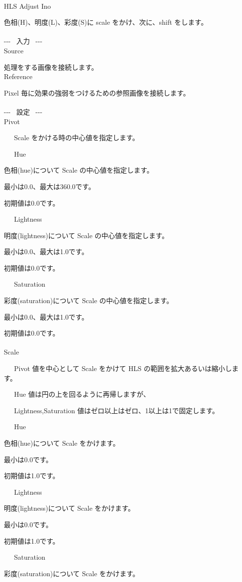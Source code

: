 \documentclass[a4paper,12pt]{article}
\begin{document}
\thispagestyle{empty}

\Large
\noindent \\
HLS Adjust Ino\medskip
\par
\normalsize
色相(H)、明度(L)、彩度(S)に scale をかけ、次に、shift をします。\\
\\
-{-}- \ 入力 \ -{-}-\\
Source\par
処理をする画像を接続します。\\
Reference\par
Pixel 毎に効果の強弱をつけるための参照画像を接続します。\\
\\
-{-}- \ 設定 \ -{-}-\\
Pivot\par
\noindent \ \ \, Scale をかける時の中心値を指定します。\\
\par
\noindent \ \ \, Hue\par
色相(hue)について Scale の中心値を指定します。\par
最小は0.0、最大は360.0です。\par
初期値は0.0です。\par
\noindent \ \ \, Lightness\par
明度(lightness)について Scale の中心値を指定します。\par
最小は0.0、最大は1.0です。\par
初期値は0.0です。\par
\noindent \ \ \, Saturation\par
彩度(saturation)について Scale の中心値を指定します。\par
最小は0.0、最大は1.0です。\par
初期値は0.0です。\\
\\
Scale\par
\noindent \ \ \, Pivot 値を中心として Scale をかけて HLS の範囲を拡大あるいは縮小します。\par
\noindent \ \ \, Hue 値は円の上を回るように再帰しますが、\par
\noindent \ \ \, Lightness,Saturation 値はゼロ以上はゼロ、1以上は1で固定します。\\
\par
\noindent \ \ \, Hue\par
色相(hue)について Scale をかけます。\par
最小は0.0です。\par
初期値は1.0です。\par
\noindent \ \ \, Lightness\par
明度(lightness)について Scale をかけます。\par
最小は0.0です。\par
初期値は1.0です。\par
\noindent \ \ \, Saturation\par
彩度(saturation)について Scale をかけます。
\end{document}
